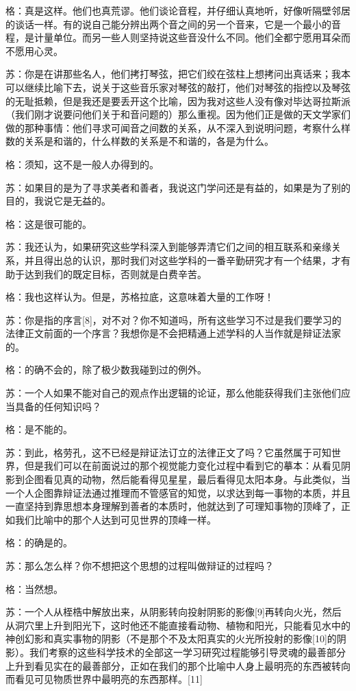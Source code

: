 \documentclass[12pt,oneside]{book}
\begin{document}
格：真是这样。他们也真荒谬。他们谈论音程，并仔细认真地听，好像听隔壁邻居的谈话一样。有的说自己能分辨出两个音之间的另一个音来，它是一个最小的音程，是计量单位。而另一些人则坚持说这些音没什么不同。他们全都宁愿用耳朵而不愿用心灵。

苏：你是在讲那些名人，他们拷打琴弦，把它们绞在弦柱上想拷问出真话来；我本可以继续比喻下去，说关于这些音乐家对琴弦的敲打，他们对琴弦的指控以及琴弦的无耻抵赖，但是我还是要丢开这个比喻，因为我对这些人没有像对毕达哥拉斯派（我们刚才说要问他们关于和音问题的）那么重视。因为他们正是做的天文学家们做的那种事情：他们寻求可闻音之间数的关系，从不深入到说明问题，考察什么样数的关系是和谐的，什么样数的关系是不和谐的，各是为什么。

格：须知，这不是一般人办得到的。

苏：如果目的是为了寻求美者和善者，我说这门学问还是有益的，如果是为了别的目的，我说它是无益的。

格：这是很可能的。

苏：我还认为，如果研究这些学科深入到能够弄清它们之间的相互联系和亲缘关系，并且得出总的认识，那时我们对这些学科的一番辛勤研究才有一个结果，才有助于达到我们的既定目标，否则就是白费辛苦。

格：我也这样认为。但是，苏格拉底，这意味着大量的工作呀！

苏：你是指的序言[8]，对不对？你不知道吗，所有这些学习不过是我们要学习的法律正文前面的一个序言？我想你是不会把精通上述学科的人当作就是辩证法家的。

格：的确不会的，除了极少数我碰到过的例外。

苏：一个人如果不能对自己的观点作出逻辑的论证，那么他能获得我们主张他们应当具备的任何知识吗？

格：是不能的。

苏：到此，格劳孔，这不已经是辩证法订立的法律正文了吗？它虽然属于可知世界，但是我们可以在前面说过的那个视觉能力变化过程中看到它的摹本：从看见阴影到企图看见真的动物，然后能看得见星星，最后看得见太阳本身。与此类似，当一个人企图靠辩证法通过推理而不管感官的知觉，以求达到每一事物的本质，并且一直坚持到靠思想本身理解到善者的本质时，他就达到了可理知事物的顶峰了，正如我们比喻中的那个人达到可见世界的顶峰一样。

格：的确是的。

苏：那么怎么样？你不想把这个思想的过程叫做辩证的过程吗？

格：当然想。

苏：一个人从桎梏中解放出来，从阴影转向投射阴影的影像[9]再转向火光，然后从洞穴里上升到阳光下，这时他还不能直接看动物、植物和阳光，只能看见水中的神创幻影和真实事物的阴影（不是那个不及太阳真实的火光所投射的影像[10]的阴影）。我们考察的这些科学技术的全部这一学习研究过程能够引导灵魂的最善部分上升到看见实在的最善部分，正如在我们的那个比喻中人身上最明亮的东西被转向而看见可见物质世界中最明亮的东西那样。[11]
\end{document}
